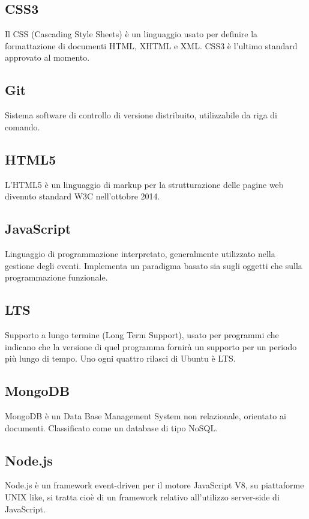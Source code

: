 \documentclass[a4paper, titlepage]{article}
\begin{document}
	\subsection{CSS3}
	Il CSS (Cascading Style Sheets) è un linguaggio usato per definire la formattazione di documenti HTML, XHTML e XML. CSS3 è l’ultimo standard approvato al momento.
	
	\subsection{Git}
	Sistema software di controllo di versione distribuito, utilizzabile da riga di comando.
	
	\subsection{HTML5}
	L’HTML5 è un linguaggio di markup per la strutturazione delle pagine web divenuto standard W3C nell’ottobre 2014.
	
	\subsection{JavaScript}
	Linguaggio di programmazione interpretato, generalmente utilizzato nella gestione degli eventi.
	Implementa un paradigma basato sia sugli oggetti che sulla programmazione funzionale.
	
	\subsection{LTS}
	 Supporto a lungo termine (Long Term Support), usato per programmi che indicano che la versione di quel programma fornirà un supporto per un periodo più lungo di tempo. Uno ogni quattro rilasci di Ubuntu è LTS.
	
	\subsection{MongoDB}
	MongoDB è un Data Base Management System non relazionale, orientato ai documenti. Classificato come un database di tipo NoSQL.
	
	\subsection{Node.js}
	Node.js è un framework event-driven per il motore JavaScript V8, su piattaforme UNIX like, si tratta cioè di un framework relativo all'utilizzo server-side di JavaScript.
	
\end{document}
